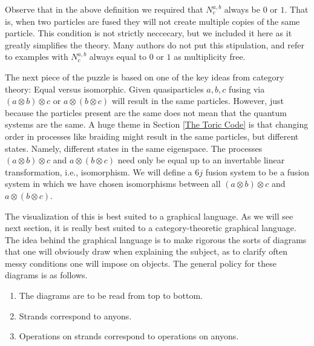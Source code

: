 \documentclass{article}
\theoremstyle{definition}
\numberwithin{figure}{section}
\begin{document}
Observe that in the above definition we required that $N_c^{a,b}$ always be $0$ or $1$. That is, when two particles are fused they will not create multiple copies of the same particle. This condition is not strictly neccecary, but we included it here as it greatly simplifies the theory. Many authors do not put this stipulation, and refer to examples with $N_c^{a,b}$ always equal to $0$ or $1$ as multiplicity free. 

The next piece of the puzzle is based on one of the key ideas from category theory: Equal versus isomorphic. Given quasiparticles $a,b,c$ fusing via $(a\otimes b)\otimes c$ or $a\otimes (b\otimes c)$ will result in the same particles. However, just because the particles present are the same does not mean that the quantum systems are the same. A huge theme in Section \ref{The Toric Code} is that changing order in processes like braiding might result in the same particles, but different states. Namely, different states in the same eigenspace. The processes $(a\otimes b)\otimes c$ and $a\otimes(b\otimes c)$ need only be equal up to an invertable linear transformation, i.e., isomorphism. We will define a $6j$ fusion system to be a fusion system in which we have chosen isomorphisms between all $(a\otimes b)\otimes c$ and $a\otimes (b\otimes c)$.

The visualization of this is best suited to a graphical language. As we will see next section, it is really best suited to a category-theoretic graphical language. The idea behind the graphical language is to make rigorous the sorts of diagrams that one will obviously draw when explaining the subject, as to clarify often messy conditions one will impose on objects. The general policy for these diagrams is as follows.

\begin{enumerate}
\item The diagrams are to be read from top to bottom.
\item Strands correspond to anyons.
\item Operations on strands correspond to operations on anyons.
\end{enumerate}
\end{document}
